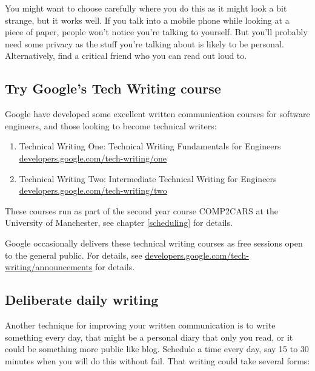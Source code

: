 \documentclass[
]{book}
\providecommand{\tightlist}{%
  \setlength{\itemsep}{0pt}\setlength{\parskip}{0pt}}
\begin{document}
You might want to choose carefully where you do this as it might look a bit strange, but it works well. If you talk into a mobile phone while looking at a piece of paper, people won't notice you're talking to yourself. But you'll probably need some privacy as the stuff you're talking about is likely to be personal. Alternatively, find a critical friend who you can read out loud to.

\hypertarget{techwriting}{%
\subsection{Try Google's Tech Writing course}\label{techwriting}}

Google have developed some excellent written communication courses for software engineers, and those looking to become technical writers:

\begin{enumerate}
\def\labelenumi{\arabic{enumi}.}
\tightlist
\item
  Technical Writing One: Technical Writing Fundamentals for Engineers \href{https://developers.google.com/tech-writing/one}{developers.google.com/tech-writing/one}
\item
  Technical Writing Two: Intermediate Technical Writing for Engineers \href{https://developers.google.com/tech-writing/two}{developers.google.com/tech-writing/two}
\end{enumerate}

These courses run as part of the second year course COMP2CARS at the University of Manchester, see chapter \ref{scheduling} for details.

Google occasionally delivers these technical writing courses as free sessions open to the general public. For details, see \href{https://developers.google.com/tech-writing/announcements}{developers.google.com/tech-writing/announcements} for details.

\hypertarget{dailywrite}{%
\subsection{Deliberate daily writing}\label{dailywrite}}

Another technique for improving your written communication is to write something every day, that might be a personal diary that only you read, or it could be something more public like blog. Schedule a time every day, say 15 to 30 minutes when you will do this without fail. That writing could take several forms:
\end{document}
